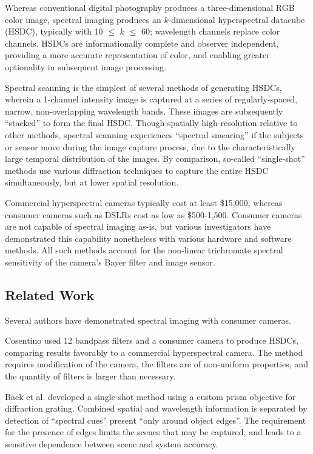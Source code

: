 \documentclass[twocolumn,10pt]{asme2ej}
\newcommand{\id}{\hspace{6 mm}}
\begin{document}

\id Whereas conventional digital photography produces a three-dimensional RGB color image, spectral imaging produces an $k$-dimensional hyperspectral datacube (HSDC), typically with 10 $\leq$ $k$ $\leq$ 60; wavelength channels replace color channels. HSDCs are informationally complete and observer independent, providing a more accurate representation of color, and enabling greater optionality in subsequent image processing.


\id Spectral scanning is the simplest of several methods of generating HSDCs, wherein a 1-channel intensity image is captured at a series of regularly-spaced, narrow, non-overlapping wavelength bands. These images are subsequently ``stacked'' to form the final HSDC. Though spatially high-resolution relative to other methods, spectral scanning experiences ``spectral smearing'' if the subjects or sensor move during the image capture process, due to the characteristically large temporal distribution of the images. By comparison, so-called ``single-shot'' methods use various diffraction techniques to capture the entire HSDC simultaneously, but at lower spatial resolution.


\id Commercial hyperspectral cameras typically cost at least \$15,000, whereas consumer cameras such as DSLRs cost as low as \$500-1,500. Consumer cameras are not capable of spectral imaging as-is, but various investigators have demonstrated this capability nonetheless with various hardware and software methods. All such methods account for the non-linear trichromate spectral sensitivity of the camera's Bayer filter and image sensor.

\subsection{Related Work}

Several authors have demonstrated spectral imaging with consumer cameras.

\id Cosentino \cite{Cosentino} used 12 bandpass filters and a consumer camera to produce HSDCs, comparing results favorably to a commercial hyperspectral camera. The method requires modification of the camera, the filters are of non-uniform properties, and the quantity of filters is larger than necessary.

\id Baek et al. \cite{Baek} developed a single-shot method using a custom prism objective for diffraction grating. Combined spatial and wavelength information is separated by detection of ``spectral cues'' present ``only around object edges''. The requirement for the presence of edges limits the scenes that may be captured, and leads to a sensitive dependence between scene and system accuracy.
\end{document}
